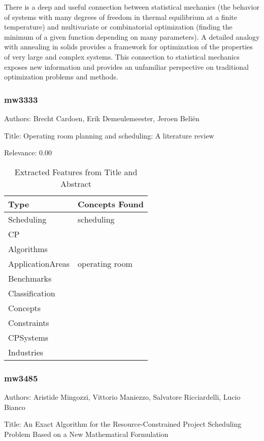  There is a deep and useful connection between statistical mechanics (the behavior of systems with many degrees of freedom in thermal equilibrium at a finite temperature) and multivariate or combinatorial optimization (finding the minimum of a given function depending on many parameters). A detailed analogy with annealing in solids provides a framework for optimization of the properties of very large and complex systems. This connection to statistical mechanics exposes new information and provides an unfamiliar perspective on traditional optimization problems and methods. 

\subsubsection{mw3333}
\label{mw:mw3333}

Authors: Brecht Cardoen, Erik Demeulemeester, Jeroen Beliën

Title: Operating room planning and scheduling: A literature review

Relevance:  0.00

{\scriptsize
\begin{longtable}{p{2cm}p{20cm}}
\caption{Extracted Features from Title and Abstract}\\ \toprule
Type & Concepts Found\\ \midrule
\endhead
\bottomrule
\endfoot
Scheduling & scheduling\\ 
CP & \\ 
Algorithms & \\ 
ApplicationAreas & operating room\\ 
Benchmarks & \\ 
Classification & \\ 
Concepts & \\ 
Constraints & \\ 
CPSystems & \\ 
Industries & \\ 
\end{longtable}
}



\subsubsection{mw3485}
\label{mw:mw3485}

Authors: Aristide Mingozzi, Vittorio Maniezzo, Salvatore Ricciardelli, Lucio Bianco

Title: An Exact Algorithm for the Resource-Constrained Project Scheduling Problem Based on a New Mathematical Formulation

